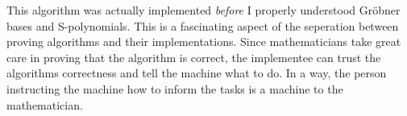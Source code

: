 This algorithm was actually implemented \textit{before} I properly understood Gröbner bases and S-polynomials. This is a fascinating aspect of the seperation between proving algorithms and their implementations. Since mathematicians take great care in proving that the algorithm is correct, the implementee can trust the algorithms correctness and tell the machine what to do. In a way, the person instructing the machine how to inform the tasks is a machine to the mathematician.